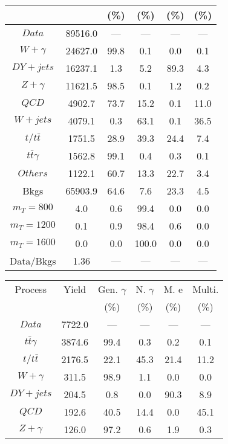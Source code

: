 \begin{figure}
\begin{minipage}[c]{0.32\textwidth}
{\begin{tabular}{cccccc}
 &  & (\%) & (\%) & (\%) & (\%)  \\
\hline
                                                                      $ Data $ &  89516.0 &  --- &  --- &  --- &  ---\\
$ W+\gamma $ &  24627.0 &  99.8 &  0.1 &  0.0 &  0.1\\
$ DY+jets $ &  16237.1 &  1.3 &  5.2 &  89.3 &  4.3\\
$ Z+\gamma $ &  11621.5 &  98.5 &  0.1 &  1.2 &  0.2\\
$ QCD $ &  4902.7 &  73.7 &  15.2 &  0.1 &  11.0\\
$ W+jets $ &  4079.1 &  0.3 &  63.1 &  0.1 &  36.5\\
$ t/t\bar{t} $ &  1751.5 &  28.9 &  39.3 &  24.4 &  7.4\\
$ t\bar{t}\gamma $ &  1562.8 &  99.1 &  0.4 &  0.3 &  0.1\\
$ Others $ &  1122.1 &  60.7 &  13.3 &  22.7 &  3.4\\
Bkgs &  65903.9 &  64.6 &  7.6 &  23.3 &  4.5\\
$ m_{T} = 800 $ &  4.0 &  0.6 &  99.4 &  0.0 &  0.0\\
$ m_{T} = 1200 $ &  0.1 &  0.9 &  98.4 &  0.6 &  0.0\\
$ m_{T} = 1600 $ &  0.0 &  0.0 &  100.0 &  0.0 &  0.0\\
Data/Bkgs &  1.36 &  --- &  --- &  --- &  ---\\
\hline
\end{tabular}
}
\end{minipage}
\begin{minipage}[c]{0.32\textwidth}
\centering
\tiny{
\begin{tabular}{cccccc}
\hline
Process & Yield & Gen. $\gamma$ & N. $\gamma$ & M. e & Multi. \\
 &  & (\%) & (\%) & (\%) & (\%)  \\
\hline
                                                                      $ Data $ &  7722.0 &  --- &  --- &  --- &  ---\\
$ t\bar{t}\gamma $ &  3874.6 &  99.4 &  0.3 &  0.2 &  0.1\\
$ t/t\bar{t} $ &  2176.5 &  22.1 &  45.3 &  21.4 &  11.2\\
$ W+\gamma $ &  311.5 &  98.9 &  1.1 &  0.0 &  0.0\\
$ DY+jets $ &  204.5 &  0.8 &  0.0 &  90.3 &  8.9\\
$ QCD $ &  192.6 &  40.5 &  14.4 &  0.0 &  45.1\\
$ Z+\gamma $ &  126.0 &  97.2 &  0.6 &  1.9 &  0.3\\

\end{tabular}}
\end{minipage}
\end{figure}
